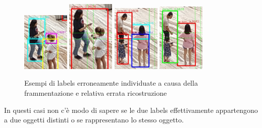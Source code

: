 \begin{figure}
\begin{center}
\includegraphics[width=0.2\textwidth, height=0.25\textheight]{images/esempio-frammentazione-2.jpg}
\includegraphics[width=0.2\textwidth, height=0.25\textheight]{images/esempio-frammentazione-3.jpg}
\includegraphics[width=0.2\textwidth, height=0.25\textheight]{images/esempio-frammentazione-8.jpg}
\includegraphics[width=0.2\textwidth, height=0.25\textheight]{images/esempio-frammentazione-7.jpg}
\end{center}
\caption{Esempi di labels erroneamente individuate a causa della frammentazione e relativa errata ricostruzione}
\end{figure}
In questi casi non c'è modo di sapere se le due labels effettivamente appartengono a due oggetti distinti o se rappresentano lo stesso oggetto.

